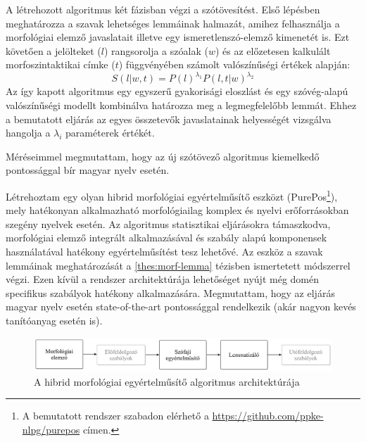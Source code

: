 A létrehozott algoritmus két fázisban végzi a szótövesítést. 
Első lépésben meghatározza a szavak lehetséges lemmáinak halmazát, amihez felhasználja a morfológiai elemző javaslatait illetve egy ismeretlenszó-elemző kimenetét is. 
Ezt követően a jelölteket ($l$)  rangsorolja a szóalak ($w$) és az előzetesen kalkulált morfoszintaktikai címke ($t$) függvényében számolt valószínűségi értékek alapján:
\begin{equation}\label{lemma-interpolated}
S(l|w,t) = P(l)^{\lambda_1} P(l,t|w)^{\lambda_2}
\end{equation}
Az így kapott algoritmus egy egyszerű gyakorisági eloszlást és egy szóvég-alapú valószínűségi modellt kombinálva határozza meg a legmegfelelőbb lemmát.
Ehhez a bemutatott eljárás az egyes összetevők javaslatainak helyességét vizsgálva hangolja a  $\lambda_i$ paraméterek értékét.

Méréseimmel megmutattam, hogy az új szótövező algoritmus kiemelkedő pontossággal bír magyar nyelv esetén. 

\thesisline%


\begin{core}
\begin{thesis}\label{thes:morf-tagging}
Létrehoztam egy olyan hibrid morfológiai egyértelműsítő eszközt (PurePos\footnote{A bemutatott rendszer szabadon elérhető a \href{https://github.com/ppke-nlpg/purepos}{https://github.com/ppke-nlpg/purepos} címen.}), mely hatékonyan alkalmazható  morfológiailag komplex és nyelvi erőforrásokban szegény nyelvek esetén. 
Az algoritmus statisztikai eljárásokra támaszkodva, morfológiai elemző integrált alkalmazásával és szabály alapú komponensek használatával hatékony egyértelműsítést tesz lehetővé. 
Az eszköz a szavak lemmáinak meghatározását a \ref{thes:morf-lemma} tézisben ismertetett módszerrel végzi.
Ezen kívül a rendszer architektúrája lehetőséget nyújt még domén specifikus szabályok hatékony alkalmazására.
Megmutattam, hogy az eljárás magyar nyelv esetén state-of-the-art pontossággal rendelkezik (akár nagyon kevés tanítóanyag esetén is).
\end{thesis}

\begin{pub}
\cite{Orosz2011,Orosz2012,Orosz2012a,Orosz2013a}
\end{pub}
\end{core}

\begin{figure}[H] 
  \centering
  \includegraphics[width=1\textwidth]{MorphTagging/architecture_hu.png} 
  \caption{A hibrid morfológiai egyértelműsítő algoritmus architektúrája}
  \label{fig:purepos-arch_hu}
\end{figure}

